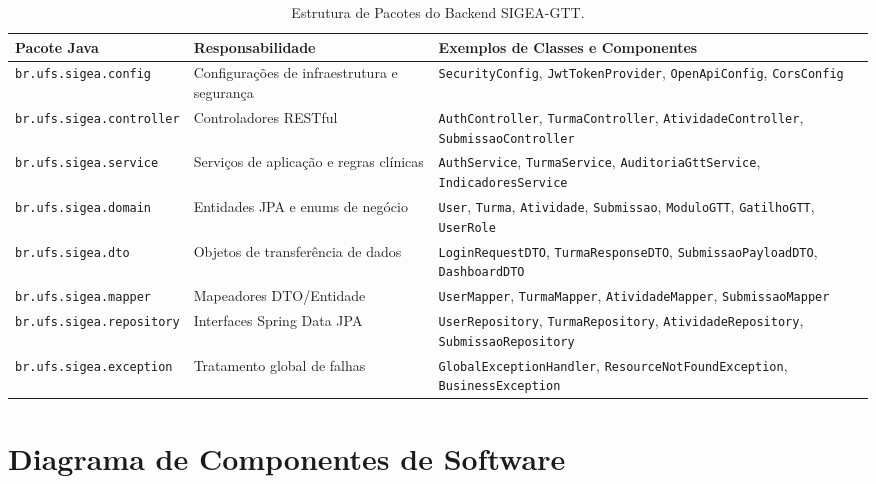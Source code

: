 \begin{table}[htb]
\centering
\small
\caption{Estrutura de Pacotes do Backend SIGEA-GTT.}
\label{tab_pacotes_backend}
\begin{tabularx}{\textwidth}{l >{\raggedright\arraybackslash}p{3.2cm} >{\raggedright\arraybackslash}X}
\toprule
\textbf{Pacote Java} & \textbf{Responsabilidade} & \textbf{Exemplos de Classes e Componentes} \\
\midrule
\texttt{br.ufs.sigea.config} & Configurações de infraestrutura e segurança & \texttt{SecurityConfig}, \texttt{JwtTokenProvider}, \texttt{OpenApiConfig}, \texttt{CorsConfig} \\
\midrule
\texttt{br.ufs.sigea.controller} & Controladores RESTful & \texttt{AuthController}, \texttt{TurmaController}, \texttt{AtividadeController}, \texttt{SubmissaoController} \\
\midrule
\texttt{br.ufs.sigea.service} & Serviços de aplicação e regras clínicas & \texttt{AuthService}, \texttt{TurmaService}, \texttt{AuditoriaGttService}, \texttt{IndicadoresService} \\
\midrule
\texttt{br.ufs.sigea.domain} & Entidades JPA e enums de negócio & \texttt{User}, \texttt{Turma}, \texttt{Atividade}, \texttt{Submissao}, \texttt{ModuloGTT}, \texttt{GatilhoGTT}, \texttt{UserRole} \\
\midrule
\texttt{br.ufs.sigea.dto} & Objetos de transferência de dados & \texttt{LoginRequestDTO}, \texttt{TurmaResponseDTO}, \texttt{SubmissaoPayloadDTO}, \texttt{DashboardDTO} \\
\midrule
\texttt{br.ufs.sigea.mapper} & Mapeadores DTO/Entidade & \texttt{UserMapper}, \texttt{TurmaMapper}, \texttt{AtividadeMapper}, \texttt{SubmissaoMapper} \\
\midrule
\texttt{br.ufs.sigea.repository} & Interfaces Spring Data JPA & \texttt{UserRepository}, \texttt{TurmaRepository}, \texttt{AtividadeRepository}, \texttt{SubmissaoRepository} \\
\midrule
\texttt{br.ufs.sigea.exception} & Tratamento global de falhas & \texttt{GlobalExceptionHandler}, \texttt{ResourceNotFoundException}, \texttt{BusinessException} \\
\bottomrule
\end{tabularx}
\end{table}

\section{Diagrama de Componentes de Software}
\label{sec_diagrama_componentes}

